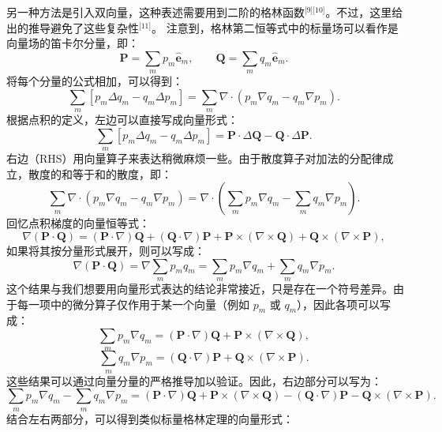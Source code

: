 另一种方法是引入双向量，这种表述需要用到二阶的格林函数\(^\text{[9][10]}\)。不过，这里给出的推导避免了这些复杂性\(^\text{[11]}\)。
注意到，格林第二恒等式中的标量场可以看作是向量场的笛卡尔分量，即：
$$
\mathbf{P} = \sum_{m} p_m \hat{\mathbf{e}}_m,
\qquad
\mathbf{Q} = \sum_{m} q_m \hat{\mathbf{e}}_m.~
$$
将每个分量的公式相加，可以得到：
$$
\sum_{m} \left[ p_m \Delta q_m - q_m \Delta p_m \right]
=
\sum_{m} \nabla \cdot \left( p_m \nabla q_m - q_m \nabla p_m \right).~
$$
根据点积的定义，左边可以直接写成向量形式：
$$
\sum_{m} \left[ p_m \Delta q_m - q_m \Delta p_m \right]
=
\mathbf{P} \cdot \Delta \mathbf{Q}
-
\mathbf{Q} \cdot \Delta \mathbf{P}.~
$$
右边（RHS）用向量算子来表达稍微麻烦一些。由于散度算子对加法的分配律成立，散度的和等于和的散度，即：
$$
\sum_{m} \nabla \cdot \left(p_{m} \nabla q_{m} - q_{m} \nabla p_{m} \right)
=
\nabla \cdot
\left(
\sum_{m} p_{m} \nabla q_{m}
-
\sum_{m} q_{m} \nabla p_{m}
\right).~
$$
回忆点积梯度的向量恒等式：
$$
\nabla(\mathbf{P} \cdot \mathbf{Q})
=
(\mathbf{P} \cdot \nabla)\mathbf{Q}
+
(\mathbf{Q} \cdot \nabla)\mathbf{P}
+
\mathbf{P} \times (\nabla \times \mathbf{Q})
+
\mathbf{Q} \times (\nabla \times \mathbf{P}),~
$$
如果将其按分量形式展开，则可以写成：
$$
\nabla(\mathbf{P} \cdot \mathbf{Q})
=
\nabla \sum_{m} p_{m} q_{m}
=
\sum_{m} p_{m} \nabla q_{m}
+
\sum_{m} q_{m} \nabla p_{m}.~
$$
这个结果与我们想要用向量形式表达的结论非常接近，只是存在一个符号差异。由于每一项中的微分算子仅作用于某一个向量（例如 $p_m$ 或 $q_m$），因此各项可以写成：
$$
\sum_{m} p_{m} \nabla q_{m} = (\mathbf{P} \cdot \nabla)\mathbf{Q} + \mathbf{P} \times (\nabla \times \mathbf{Q}),~
$$
$$
\sum_{m} q_{m} \nabla p_{m} = (\mathbf{Q} \cdot \nabla)\mathbf{P} + \mathbf{Q} \times (\nabla \times \mathbf{P}).~
$$
这些结果可以通过向量分量的严格推导加以验证。因此，右边部分可以写为：
$$
\sum_{m} p_{m} \nabla q_{m} - \sum_{m} q_{m} \nabla p_{m} =
(\mathbf{P} \cdot \nabla)\mathbf{Q} + \mathbf{P} \times (\nabla \times \mathbf{Q})
- (\mathbf{Q} \cdot \nabla)\mathbf{P} - \mathbf{Q} \times (\nabla \times \mathbf{P}).~
$$
结合左右两部分，可以得到类似标量格林定理的向量形式：


